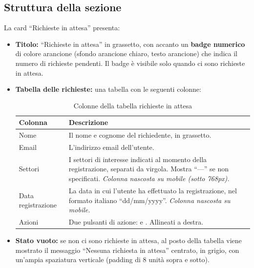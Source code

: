 \documentclass[a4paper,11pt,oneside]{book}
\newcommand{\pulsante}[1]{\fcolorbox{namoCharcoal}{namoGray}{\small\textsf{\textbf{#1}}}}
\begin{document}
\subsection{Struttura della sezione}

La card ``Richieste in attesa'' presenta:

\begin{itemize}[leftmargin=1.5em]
  \item \textbf{Titolo:} ``Richieste in attesa'' in grassetto, con accanto un \textbf{badge numerico} di colore \textcolor{namoOrange}{arancione} (sfondo arancione chiaro, testo arancione) che indica il numero di richieste pendenti. Il badge \`e visibile solo quando ci sono richieste in attesa.

  \item \textbf{Tabella delle richieste:} una tabella con le seguenti colonne:

    \begin{table}[htbp]
    \centering
    \caption{Colonne della tabella richieste in attesa}
    \label{tab:colonne-richieste-attesa}
    \begin{tabularx}{\textwidth}{l X}
    \toprule
    \textbf{Colonna} & \textbf{Descrizione} \\
    \midrule
    Nome              & Il nome e cognome del richiedente, in grassetto. \\
    Email             & L'indirizzo email dell'utente. \\
    Settori           & I settori di interesse indicati al momento della registrazione, separati da virgola. Mostra ``---'' se non specificati. \textit{Colonna nascosta su mobile (sotto 768px).} \\
    Data registrazione & La data in cui l'utente ha effettuato la registrazione, nel formato italiano ``dd/mm/yyyy''. \textit{Colonna nascosta su mobile.} \\
    Azioni            & Due pulsanti di azione: \pulsante{Approva} e \pulsante{Rifiuta}. Allineati a destra. \\
    \bottomrule
    \end{tabularx}
    \end{table}

  \item \textbf{Stato vuoto:} se non ci sono richieste in attesa, al posto della tabella viene mostrato il messaggio ``Nessuna richiesta in attesa'' centrato, in grigio, con un'ampia spaziatura verticale (padding di 8 unit\`a sopra e sotto).
\end{itemize}
\end{document}
